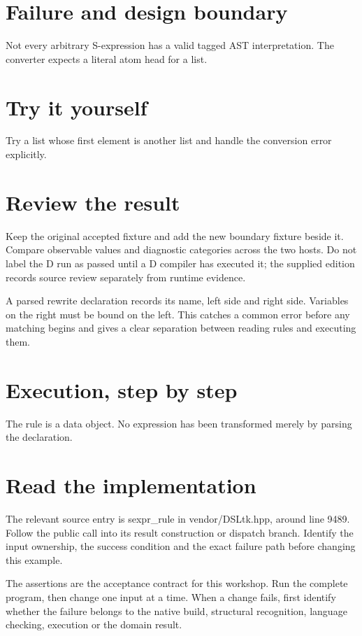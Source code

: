 
\section*{Failure and design boundary}
Not every arbitrary S-expression has a valid tagged AST interpretation. The converter expects a literal atom head for a list.

\section*{Try it yourself}
Try a list whose first element is another list and handle the conversion error explicitly.

\section*{Review the result}
Keep the original accepted fixture and add the new boundary fixture beside it. Compare observable values and diagnostic categories across the two hosts. Do not label the D run as passed until a D compiler has executed it; the supplied edition records source review separately from runtime evidence.

\clearpage
{}
A parsed rewrite declaration records its name, left side and right side. Variables on the right must be bound on the left. This catches a common error before any matching begins and gives a clear separation between reading rules and executing them.


\section*{Execution, step by step}
The rule is a data object. No expression has been transformed merely by parsing the declaration.

\section*{Read the implementation}
The relevant source entry is sexpr\_rule in vendor/DSLtk.hpp, around line 9489. Follow the public call into its result construction or dispatch branch. Identify the input ownership, the success condition and the exact failure path before changing this example.

The assertions are the acceptance contract for this workshop. Run the complete program, then change one input at a time. When a change fails, first identify whether the failure belongs to the native build, structural recognition, language checking, execution or the domain result.

